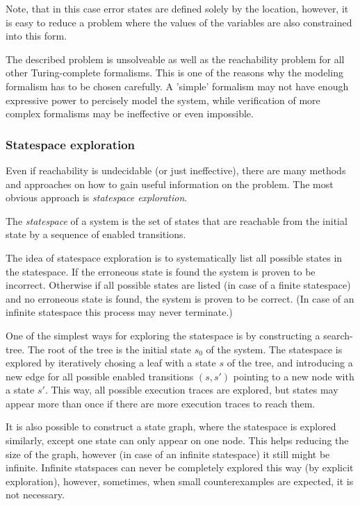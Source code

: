 Note, that in this case error states are defined solely by the location, however, it is easy to reduce a problem where the values of the variables are also constrained into this form.

\begin{example}
\end{example}

The described problem is unsolveable as well as the reachability problem for all other Turing-complete formalisms. This is one of the reasons why the modeling formalism has to be chosen carefully. A 'simple' formalism may not have enough expressive power to percisely model the system, while verification of more complex formalisms may be ineffective or even impossible.

\subsubsection{Statespace exploration}

Even if reachability is undecidable (or just ineffective), there are many methods and approaches on how to gain useful information on the problem. The most obvious approach is \emph{statespace exploration}.

\begin{dfn}
	The \emph{statespace} of a system is the set of states that are reachable from the initial state by a sequence of enabled transitions. 
\end{dfn}

The idea of statespace exploration is to systematically list all possible states in the statespace. If the erroneous state is found the system is proven to be incorrect. Otherwise if all possible states are listed (in case of a finite statespace) and no erroneous state is found, the system is proven to be correct. (In case of an infinite statespace this process may never terminate.)

One of the simplest ways for exploring the statespace is by constructing a search-tree. The root of the tree is the initial state $s_0$ of the system. The statespace is explored by iteratively chosing a leaf with a state $s$ of the tree, and introducing a new edge for all possible enabled transitions $(s,s')$ pointing to a new node with a state $s'$. This way, all possible execution traces are explored, but states may appear more than once if there are more execution traces to reach them.

It is also possible to construct a state graph, where the statespace is explored similarly, except one state can only appear on one node. This helps reducing the size of the graph, however (in case of an infinite statespace) it still might be infinite. Infinite statspaces can never be completely explored this way (by explicit exploration), however, sometimes, when small counterexamples are expected, it is not necessary.

